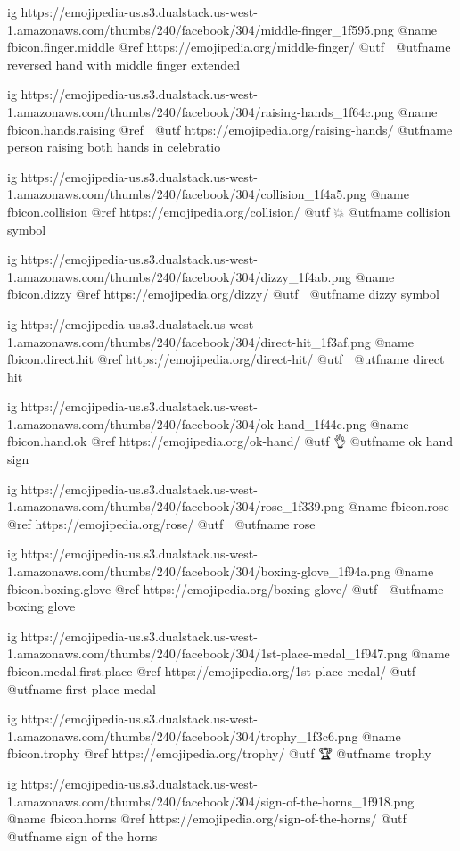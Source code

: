   ig https://emojipedia-us.s3.dualstack.us-west-1.amazonaws.com/thumbs/240/facebook/304/middle-finger_1f595.png
  @name fbicon.finger.middle
  @ref https://emojipedia.org/middle-finger/
  @utf 🖕
  @utfname reversed hand with middle finger extended

  ig https://emojipedia-us.s3.dualstack.us-west-1.amazonaws.com/thumbs/240/facebook/304/raising-hands_1f64c.png
  @name fbicon.hands.raising
  @ref 🙌
  @utf https://emojipedia.org/raising-hands/
  @utfname person raising both hands in celebratio

  ig https://emojipedia-us.s3.dualstack.us-west-1.amazonaws.com/thumbs/240/facebook/304/collision_1f4a5.png
  @name fbicon.collision
  @ref https://emojipedia.org/collision/
  @utf 💥
  @utfname collision symbol

  ig https://emojipedia-us.s3.dualstack.us-west-1.amazonaws.com/thumbs/240/facebook/304/dizzy_1f4ab.png
  @name fbicon.dizzy
  @ref https://emojipedia.org/dizzy/
  @utf 💫
  @utfname dizzy symbol

  ig https://emojipedia-us.s3.dualstack.us-west-1.amazonaws.com/thumbs/240/facebook/304/direct-hit_1f3af.png
  @name fbicon.direct.hit
  @ref https://emojipedia.org/direct-hit/
  @utf 🎯
  @utfname direct hit

  ig https://emojipedia-us.s3.dualstack.us-west-1.amazonaws.com/thumbs/240/facebook/304/ok-hand_1f44c.png
  @name fbicon.hand.ok
  @ref https://emojipedia.org/ok-hand/
  @utf 👌
  @utfname ok hand sign

  ig https://emojipedia-us.s3.dualstack.us-west-1.amazonaws.com/thumbs/240/facebook/304/rose_1f339.png
  @name fbicon.rose
  @ref https://emojipedia.org/rose/
  @utf 🌹
  @utfname rose

  ig https://emojipedia-us.s3.dualstack.us-west-1.amazonaws.com/thumbs/240/facebook/304/boxing-glove_1f94a.png
  @name fbicon.boxing.glove
  @ref https://emojipedia.org/boxing-glove/
  @utf 🥊
  @utfname boxing glove

  ig https://emojipedia-us.s3.dualstack.us-west-1.amazonaws.com/thumbs/240/facebook/304/1st-place-medal_1f947.png
  @name fbicon.medal.first.place
  @ref https://emojipedia.org/1st-place-medal/
  @utf 🥇
  @utfname first place medal

  ig https://emojipedia-us.s3.dualstack.us-west-1.amazonaws.com/thumbs/240/facebook/304/trophy_1f3c6.png
  @name fbicon.trophy
  @ref https://emojipedia.org/trophy/
  @utf 🏆
  @utfname trophy

  ig https://emojipedia-us.s3.dualstack.us-west-1.amazonaws.com/thumbs/240/facebook/304/sign-of-the-horns_1f918.png
  @name fbicon.horns
  @ref https://emojipedia.org/sign-of-the-horns/
  @utf 🤘
  @utfname sign of the horns

